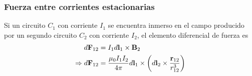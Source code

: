 \documentclass[]{article}
\numberwithin{equation}{section}
\begin{document}
\subsubsection{Fuerza entre corrientes estacionarias}
Si un circuito \(C_1\) con corriente \(I_1\) se encuentra inmerso en el campo producido por un segundo circuito \(C_2\) con corriente \(I_2\), el elemento diferencial de fuerza es
\begin{align}
	d \mathbf{F}_{12} &= I_{1} d\mathbf{l}_{1} \times \mathbf{B}_{2}\\
	\Rightarrow d \mathbf{F}_{12} &= \frac{\mu_{0} I_{1} I_{2}}{4 \pi} d\mathbf{l}_{1} \times \left(d\mathbf{l}_{2} \times \frac{\mathbf{r}_{12}}{r^{3}_{12}}\right)
\end{align}
\begin{figure}[h!]
	\centering
	\begin{tikzpicture}[x=0.75pt,y=0.75pt,yscale=-1,xscale=1]
		

\end{tikzpicture}
\end{figure}
\end{document}

